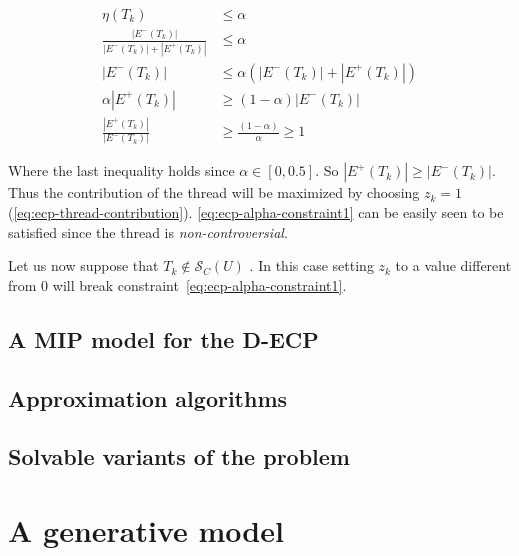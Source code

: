 \begin{align}
	\eta(T_k)                                                 & \leq \alpha                                    \\
	\frac{|E^{-} (T_{k})|}{|E^{-} (T_{k})| + |E^{+} (T_{k})|} & \leq \alpha                                    \\
	{|E^{-} (T_{k})|}                                         & \leq \alpha(|E^{-} (T_{k})| + |E^{+} (T_{k})|) \\
	\alpha {|E^{+} (T_{k})|}                                  & \geq (1 -
	\alpha ) |E^{-} (T_{k})|                                                                                   \\
	\frac{{|E^{+} (T_{k})|}}{|E^{-} (T_{k})|}
	                                                          & \geq \frac{(1 -
		\alpha )}{\alpha } \geq 1
\end{align}

Where the last inequality holds since $\alpha \in [0, 0.5]$. So $|E^{+} (T_{k})| \geq
	|E^{-} (T_{k})|$. Thus the contribution of the thread will be maximized by
choosing $z_k = 1$ (\autoref{eq:ecp-thread-contribution}).
\autoref{eq:ecp-alpha-constraint1} can be easily seen to be satisfied since the
thread is \emph{non-controversial}.

Let us now suppose that $T_k \not\in \mathcal{S}_{C}(U)  $ . In this case setting $z_k$ to a value
different from $0$ will break constraint~\ref{eq:ecp-alpha-constraint1}.

\subsection{A MIP model for the \acrshort{D-ECP}}%
\label{sub:a_mip_model_for_the_ecp}

\subsection{Approximation algorithms}%
\label{sub:approximation_algorithms}

\subsection{Solvable variants of the problem}%
\label{sub:solvable_variants_of_the_problem}

\section{A generative model}%
\label{sec:generative_model}



